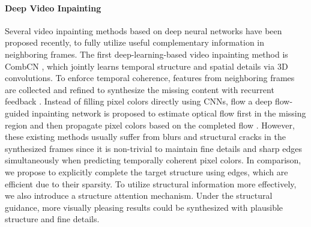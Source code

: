 \paragraph{Deep Video Inpainting}
Several video inpainting methods based on deep neural networks have been proposed recently, to fully utilize useful complementary information in neighboring frames.
%
The first deep-learning-based video inpainting method is CombCN \cite{wang2019video}, which jointly learns temporal structure and spatial details via 3D convolutions.
%
To enforce temporal coherence, features from neighboring frames are collected and refined to synthesize the missing content with recurrent feedback \cite{Kim_2019_CVPR1,Kim_2019_CVPR}. 
%
Instead of filling pixel colors directly using CNNs, flow a deep flow-guided inpainting network is proposed to estimate optical flow first in the missing region and then propagate pixel colors based on the completed flow \cite{Xu_2019_CVPR}.
However, these existing methods usually suffer from blurs and structural cracks in the synthesized frames since it is non-trivial to maintain fine details and sharp edges simultaneously when predicting temporally coherent pixel colors. 
In comparison, we propose to explicitly complete the target structure using edges, which are efficient due to their sparsity. To utilize structural information more effectively, we also introduce a structure attention mechanism. 
Under the structural guidance, more visually pleasing results could be synthesized with plausible structure and fine details. 

 



























